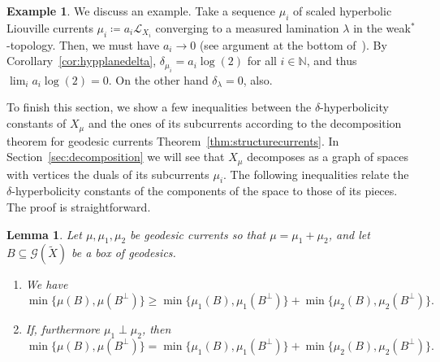 \documentclass[12pt,article]{amsart}
\numberwithin{equation}{section}
\numberwithin{figure}{section}
\newtheorem{lemma}[equation]{Lemma}
\theoremstyle{definition}
\newtheorem{example}[equation]{Example}
\theoremstyle{plain}
\newcommand*{\wt}[1]{\widetilde{#1}}
\begin{document}
\begin{example}
We discuss an example.
 Take a sequence $\mu_i$ of scaled hyperbolic Liouville currents $\mu_i \coloneqq a_i \mathcal{L}_{X_i}$ converging to a measured lamination  $\lambda$ in the weak$^*$-topology. Then, we must have $a_i \to 0$ (see argument at the bottom of~\cite[Page~152]{Bonahon88:GeodesicCurrent}).
By Corollary~\ref{cor:hypplanedelta}, $\delta_{\mu_i}=a_i\log(2)$ for all $i \in \mathbb{N}$, and thus $\lim_i a_i \log(2)=0$.
On the other hand $\delta_{\lambda}=0$, also.
\end{example}

To finish this section, we show a few inequalities between the $\delta$-hyperbolicity constants of $X_{\mu}$ and the ones of its subcurrents according to the decomposition theorem for geodesic currents Theorem~\ref{thm:structurecurrents}. 
In Section~\ref{sec:decomposition} we will see that $X_{\mu}$ decomposes as a graph of spaces with vertices the duals of its subcurrents $\mu_i$.
The following inequalities relate the $\delta$-hyperbolicity constants of the components of the space to those of its pieces. The proof is straightforward.

\begin{lemma}
Let $\mu,\mu_1,\mu_2$ be geodesic currents so that $\mu=\mu_1+\mu_2$, and let $B \subseteq \mathcal{G}(\wt{X})$ be a box of geodesics. 
\begin{enumerate}
    \item We have \[\min \{ \mu(B), \mu(B^{\perp}) \} \geq \min \{ \mu_1(B), \mu_1(B^{\perp}) \} +  \min \{ \mu_2(B), \mu_2(B^{\perp}) \}.\]
    \item If, furthermore $\mu_1 \perp \mu_2$, then
    \[\min \{ \mu(B), \mu(B^{\perp}) \} = \min \{ \mu_1(B), \mu_1(B^{\perp}) \} +  \min \{ \mu_2(B), \mu_2(B^{\perp}) \}.
    \]
\end{enumerate}
\label{lem:ortho}
\end{lemma}
\end{document}
